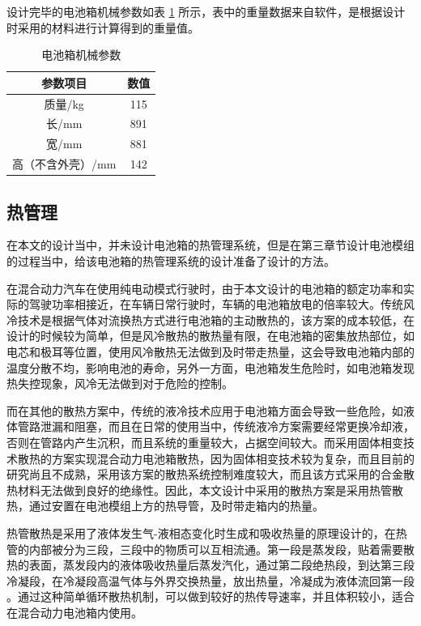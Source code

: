 设计完毕的电池箱机械参数如表 \ref{tab:mechinfo} 所示，表中的重量数据来自软件，是根据设计时采用的材料进行计算得到的重量值。

\begin{table}
	\centering
	\caption{电池箱机械参数} \label{tab:mechinfo}
	\begin{tabular*}{0.7\textwidth}{@{\extracolsep{\fill}}cc}
		\toprule
		参数项目			&数值		 \\
		\midrule
		质量/kg	     &115  \\
		长/mm     &891  \\
		宽/mm      &881\\
		高（不含外壳）/mm     &142  \\
		\bottomrule
	\end{tabular*}
\end{table}

\subsection{热管理}
在本文的设计当中，并未设计电池箱的热管理系统，但是在第三章节设计电池模组的过程当中，给该电池箱的热管理系统的设计准备了设计的方法。

在混合动力汽车在使用纯电动模式行驶时，由于本文设计的电池箱的额定功率和实际的驾驶功率相接近，在车辆日常行驶时，车辆的电池箱放电的倍率较大。传统风冷技术是根据气体对流换热方式进行电池箱的主动散热的，该方案的成本较低，在设计的时候较为简单，但是风冷散热的散热量有限，在电池箱的密集放热部位，如电芯和极耳等位置，使用风冷散热无法做到及时带走热量，这会导致电池箱内部的温度分散不均，影响电池的寿命，另外一方面，电池箱发生危险时，如电池箱发现热失控现象，风冷无法做到对于危险的控制。

而在其他的散热方案中，传统的液冷技术应用于电池箱方面会导致一些危险，如液体管路泄漏和阻塞，而且在日常的使用当中，传统液冷方案需要经常更换冷却液，否则在管路内产生沉积，而且系统的重量较大，占据空间较大。而采用固体相变技术散热的方案实现混合动力电池箱散热，因为固体相变技术较为复杂，而且目前的研究尚且不成熟，采用该方案的散热系统控制难度较大，而且该方式采用的合金散热材料无法做到良好的绝缘性。因此，本文设计中采用的散热方案是采用热管散热，通过安置在电池模组上方的热导管，及时带走箱内的热量。

热管散热是采用了液体发生气-液相态变化时生成和吸收热量的原理设计的，在热管的内部被分为三段，三段中的物质可以互相流通。第一段是蒸发段，贴着需要散热的表面，蒸发段内的液体吸收热量后蒸发汽化，通过第二段绝热段，到达第三段冷凝段，在冷凝段高温气体与外界交换热量，放出热量，冷凝成为液体流回第一段 \cite{周海阔2017基于热管技术的锂电池箱热管理系统设计与实验验证}。通过这种简单循环散热机制，可以做到较好的热传导速率，并且体积较小，适合在混合动力电池箱内使用。

